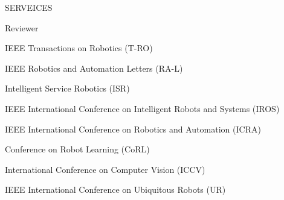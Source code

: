 \begin{rSection}{SERVEICES}{}{}{}        
    \begin{rSubsection}{Reviewer}{}{}{}   
        \item IEEE Transactions on Robotics (T-RO) 
        \item IEEE Robotics and Automation Letters (RA-L)        
        \item Intelligent Service Robotics (ISR)             
        \item IEEE International Conference on Intelligent Robots and Systems (IROS)
        \item IEEE International Conference on Robotics and Automation (ICRA)    
        \item Conference on Robot Learning (CoRL)   
        \item International Conference on Computer Vision (ICCV)
        \item IEEE International Conference on Ubiquitous Robots (UR)
        
     \end{rSubsection}  
 \end{rSection}

